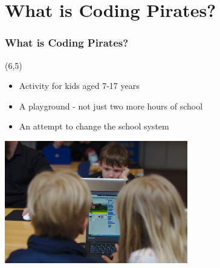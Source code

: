 \documentclass{beamer}
\begin{document}
\section{What is Coding Pirates?}
\begin{frame}
\frametitle{What is Coding Pirates?}
\begin{textblock}{20}(6,5)
\end{textblock}

\begin{itemize}
\item Activity for kids aged 7-17 years
\item A playground - not just two more hours of school
\item An attempt to change the school system
\end{itemize}

\begin{center}
   \includegraphics[width=0.6\textwidth]{imagery/william-sofie}
\end{center}

\end{frame}
\end{document}
